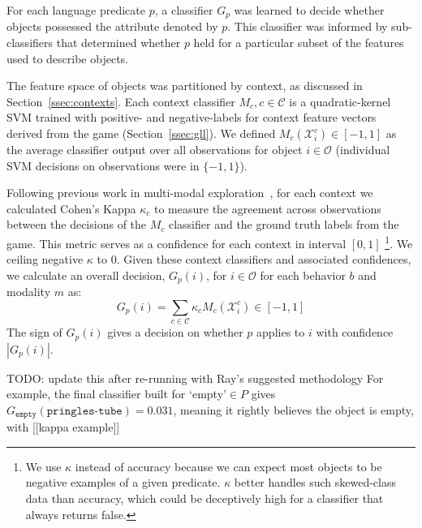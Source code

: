 For each language predicate $p$, a classifier $G_p$ was learned to decide whether objects possessed the attribute denoted by $p$.
This classifier was informed by sub-classifiers that determined whether $p$ held for a particular subset of the features used to describe objects.

The feature space of objects was partitioned by context, as discussed in Section~\ref{ssec:contexts}.
Each context classifier $M_{c}, c\in\mathcal{C}$ is a quadratic-kernel SVM trained with positive- and negative-labels for context feature vectors derived from the \ispy game (Section~\ref{ssec:gll}).
We defined $M_{c}(\mathcal{X}_i^c)\in [-1,1]$ as the average classifier output over all observations for object $i\in\mathcal{O}$ (individual SVM decisions on observations were in $\{-1,1\}$).

Following previous work in multi-modal exploration~\cite{sinapov:icra14}, for each context we calculated Cohen's Kappa $\kappa_{c}$ to measure the agreement across observations between the decisions of the $M_{c}$ classifier and the ground truth labels from the \ispy game. This metric serves as a confidence for each context in interval $[0,1]$ 
\footnote{We use $\kappa$ instead of accuracy because we can expect most objects to be negative examples of a given predicate. $\kappa$ better handles such skewed-class data than accuracy, which could be deceptively high for a classifier that always returns false.}.
We ceiling negative $\kappa$ to $0$.
Given these context classifiers and associated confidences, we calculate an overall decision, $G_p(i)$, for $i\in\mathcal{O}$ for each behavior $b$ and modality $m$ as:
\begin{equation}
	G_p(i) = \sum_{c\in\mathcal{C}}{\kappa_{c} M_{c}(\mathcal{X}_i^c)} \in [-1,1]
\end{equation}
The sign of $G_p(i)$ gives a decision on whether $p$ applies to $i$ with confidence $|G_p(i)|$.

TODO: update this after re-running with Ray's suggested methodology
For example, the final classifier built for `empty'$\in P$ gives $G_{\texttt{empty}}(\texttt{pringles-tube}) = 0.031$, meaning it rightly believes the object is empty, with [[kappa example]]